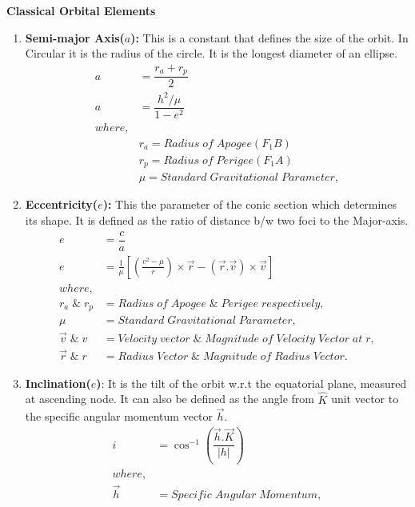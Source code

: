 \large \hspace{-3em}\textbf{Classical Orbital Elements}
\normalsize
\begin{enumerate}
\item \textbf{Semi-major Axis($a$):} This is a constant that defines the size of the orbit. In Circular it is the radius of the circle. It is the longest diameter of an ellipse.
\begin{align}
a&= \dfrac{r_a+r_p}{2}\\
a&=\dfrac{h^2/\mu}{1-e^2}\\
where,\nonumber \\
&r_a = Radius\;of\;Apogee(F_1B)\nonumber\\
&r_p = Radius\;of\;Perigee(F_1A)\nonumber \\
&\mu = Standard\;Gravitational\;Parameter,\nonumber
\end{align}
\item \textbf{Eccentricity($e$):} This the parameter of the conic section which determines its shape. It is defined as the ratio of distance b/w two foci to the Major-axis.
\begin{align}
e&=\dfrac{c}{a}\\
e&=\frac{1}{\mu}\left[\left(\frac{v^2-\mu}{r}\right)\times \overrightarrow{r}-(\overrightarrow{r}.\overrightarrow{v})\times \overrightarrow{v}\right]\label{codeformecc} \\ 
where, \nonumber\\
r_a\;\&\;r_p &= Radius\;of\;Apogee\;\&\;Perigee\;respectively,\nonumber\\
\mu &= Standard\;Gravitational\;Parameter,\nonumber \\
\overrightarrow{v}\;\&\; v &= Velocity\;vector\;\&\;Magnitude\;of\;Velocity\;Vector\;at\;r,\nonumber \\
\overrightarrow{r}\;\&\;r &= Radius\;Vector\;\&\;Magnitude\;of\;Radius\;Vector.\nonumber 
\end{align}
\item \textbf{Inclination($e$)}: It is the tilt of the orbit w.r.t the equatorial plane, measured at ascending node. It can also be defined as the angle from $\hat{K}$ unit vector to the specific angular momentum vector $\vec{h}$.
\begin{align}
i &= \cos^{-1}\left(\dfrac{\overrightarrow{h}.\overrightarrow{K}}{|h|}\right)\\
where,\nonumber \\
\overrightarrow{h}&=Specific\;Angular\;Momentum, \nonumber \\

\end{align}
\end{enumerate}
